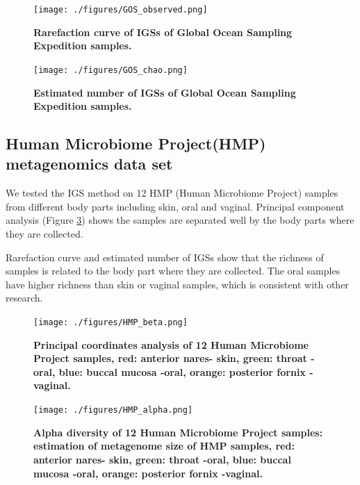 \begin{figure}[!ht]
 \centerline{\texttt{[image: ./figures/GOS\_observed.png]}}
\caption{\bf Rarefaction curve of IGSs of Global Ocean Sampling Expedition
samples.}
\label{fig:GOS-rarefaction}
\end{figure}

\begin{figure}[!ht]
 \centerline{\texttt{[image: ./figures/GOS\_chao.png]}}
\caption{\bf Estimated number of IGSs of Global Ocean Sampling Expedition
 samples.}
\label{fig:GOS-chao1}
\end{figure}




\subsection{Human Microbiome Project(HMP) metagenomics data set}

We tested the IGS method on 12 HMP (Human Microbiome Project) samples from 
different body parts including skin, oral and vaginal.
Principal component analysis (Figure \ref{fig:HMP_beta}) shows the samples are 
separated well by the body parts where they are collected.%

Rarefaction curve and estimated number of IGSs show that the richness of 
samples is related to the body part where they are collected. The 
oral samples have higher richness than skin or vaginal samples, 
which is consistent with other research. \cite{Human-Microbiome-Project-Consortium:2012aa}



\begin{figure}[!ht]
 \centerline{\texttt{[image: ./figures/HMP\_beta.png]}}
\caption{\bf Principal coordinates analysis of 12 Human Microbiome Project
samples, red: anterior nares- skin, green: throat -oral, blue: buccal mucosa -oral, orange: 
posterior fornix -vaginal.}
\label{fig:HMP_beta}
\end{figure}

\begin{figure}[!ht]
 \centerline{\texttt{[image: ./figures/HMP\_alpha.png]}}
\caption{\bf Alpha diversity of 12 Human Microbiome Project samples:
 estimation of metagenome size of HMP samples,
red: anterior nares- skin, green: throat -oral, blue: buccal mucosa -oral, orange: 
posterior fornix -vaginal.}
\label{fig:HMP_alpha}
\end{figure}





